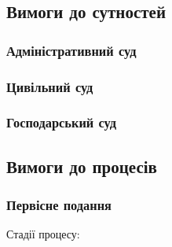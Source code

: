\documentclass{article}
\begin{document}
\subsection{Вимоги до сутностей}

\subsubsection{Адміністративний суд}

\subsubsection{Цивільний суд}

\subsubsection{Господарський суд}

\newpage
\subsection{Вимоги до процесів}

\subsubsection{Первісне подання}

Стадії процесу:
\end{document}
